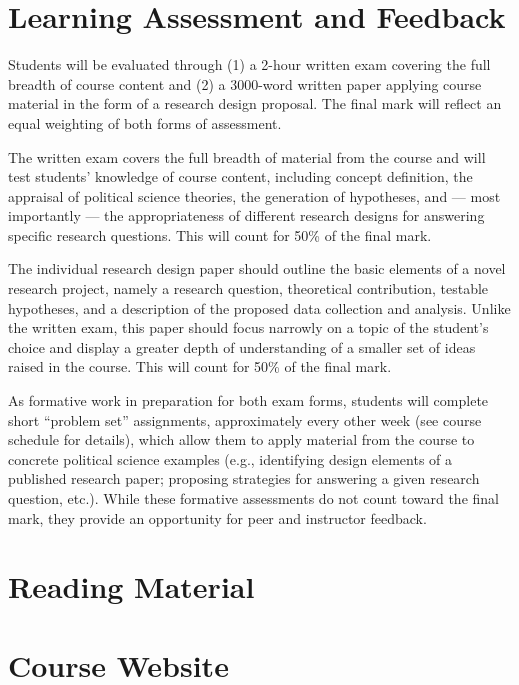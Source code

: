 \documentclass[12pt,a4paper]{article}
\begin{document}
\section{Learning Assessment and Feedback}

Students will be evaluated through (1) a 2-hour written exam covering the full breadth of course content and (2) a 3000-word written paper applying course material in the form of a research design proposal. The final mark will reflect an equal weighting of both forms of assessment.

The written exam covers the full breadth of material from the course and will test students' knowledge of course content, including concept definition, the appraisal of political science theories, the generation of hypotheses, and --- most importantly --- the appropriateness of different research designs for answering specific research questions. This will count for 50\% of the final mark.

The individual research design paper should outline the basic elements of a novel research project, namely a research question, theoretical contribution, testable hypotheses, and a description of the proposed data collection and analysis. Unlike the written exam, this paper should focus narrowly on a topic of the student's choice and display a greater depth of understanding of a smaller set of ideas raised in the course. This will count for 50\% of the final mark.

As formative work in preparation for both exam forms, students will complete short ``problem set'' assignments, approximately every other week (see course schedule for details), which allow them to apply material from the course to concrete political science examples (e.g., identifying design elements of a published research paper; proposing strategies for answering a given research question, etc.). While these formative assessments do not count toward the final mark, they provide an opportunity for peer and instructor feedback.


\clearpage
\section{Reading Material}

\section{Course Website}




\clearpage
\end{document}
